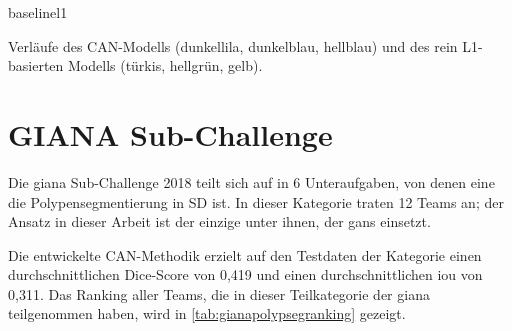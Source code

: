 \begin{losses}{baselinel1}
	\caption[Verläufe des CAN-Modells und des rein L1-basierten Modells]{Verläufe des CAN-Modells (dunkellila, dunkelblau, hellblau) und des rein L1-basierten Modells (türkis, hellgrün, gelb).}
	\label{fig:lossbaselinel1}
\end{losses}



\section{GIANA Sub-Challenge}

Die \gls{giana} Sub-Challenge 2018 teilt sich auf in 6 Unteraufgaben, von denen eine die Polypensegmentierung in SD ist.
In dieser Kategorie traten 12 Teams an; der Ansatz in dieser Arbeit ist der einzige unter ihnen, der \glspl{gan} einsetzt.

Die entwickelte CAN-Methodik erzielt auf den Testdaten der Kategorie einen durchschnittlichen Dice-Score von 0,419 und einen durchschnittlichen \gls{iou} von 0,311.
Das Ranking aller Teams, die in dieser Teilkategorie der \gls{giana} teilgenommen haben, wird in \autoref{tab:gianapolypsegranking} gezeigt.

